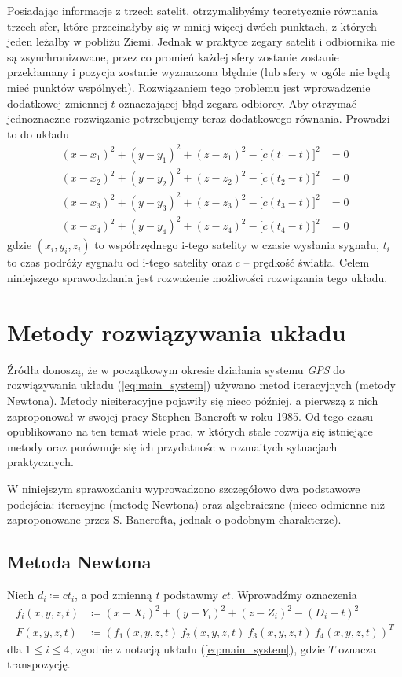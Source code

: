 \documentclass{article}
\begin{document}
Posiadając informacje z trzech satelit, otrzymalibyśmy teoretycznie równania trzech sfer, które przecinałyby się w
mniej więcej dwóch punktach, z których jeden leżałby w pobliżu Ziemi. Jednak w praktyce zegary satelit i odbiornika
nie są zsynchronizowane, przez co promień każdej sfery zostanie zostanie przekłamany i pozycja zostanie wyznaczona błędnie
(lub sfery w ogóle nie będą mieć punktów wspólnych). Rozwiązaniem tego problemu jest wprowadzenie dodatkowej zmiennej $t$
oznaczającej błąd zegara odbiorcy. Aby otrzymać jednoznaczne rozwiązanie potrzebujemy teraz dodatkowego równania.
Prowadzi to do układu
\begin{equation} \label{eq:main_system}
\begin{aligned}
    (x-x_1)^2 + (y-y_1)^2 + (z-z_1)^2 - \big[c(t_1-t)\big]^2 &= 0 \\
    (x-x_2)^2 + (y-y_2)^2 + (z-z_2)^2 - \big[c(t_2-t)\big]^2 &= 0 \\
    (x-x_3)^2 + (y-y_3)^2 + (z-z_3)^2 - \big[c(t_3-t)\big]^2 &= 0 \\
    (x-x_4)^2 + (y-y_4)^2 + (z-z_4)^2 - \big[c(t_4-t)\big]^2 &= 0
\end{aligned}
\end{equation}
gdzie $(x_i, y_i, z_i)$ to współrzędnego i-tego satelity w czasie wysłania sygnału, $t_i$ to czas podróży sygnału od
i-tego satelity oraz $c$ -- prędkość światła.
Celem niniejszego sprawodzdania jest rozważenie możliwości rozwiązania tego układu.

\section{Metody rozwiązywania układu}
Źródła donoszą, że w początkowym okresie działania systemu \textit{GPS} do rozwiązywania układu (\ref{eq:main_system})
używano metod iteracyjnych (metody Newtona). Metody nieiteracyjne pojawiły się nieco później, a pierwszą z nich
zaproponował w swojej pracy Stephen Bancroft w roku 1985. Od tego czasu opublikowano na ten temat wiele prac, w których
stale rozwija się istniejące metody oraz porównuje się ich przydatnośc w rozmaitych sytuacjach praktycznych.

W niniejszym sprawozdaniu wyprowadzono szczegółowo dwa podstawowe podejścia: iteracyjne (metodę Newtona) oraz
algebraiczne (nieco odmienne niż zaproponowane przez S. Bancrofta, jednak o podobnym charakterze).

\subsection{Metoda Newtona} \label{newton}
Niech $d_i \coloneqq ct_i$, a pod zmienną $t$ podstawmy $ct$.
Wprowadźmy oznaczenia
\begin{align}
\label{eq:f} f_i(x, y, z, t) &\coloneqq (x-X_i)^2 + (y-Y_i)^2 + (z-Z_i)^2 - (D_i-t)^2 \\
\label{eq:F} F(x, y, z, t) &\coloneqq (f_1(x, y, z, t) \ f_2(x, y, z, t) \ f_3(x, y, z, t) \ f_4(x, y, z, t))^T
\end{align}
dla $1 \leq i \leq 4$, zgodnie z notacją układu (\ref{eq:main_system}), gdzie $T$ oznacza transpozycję.
\end{document}
